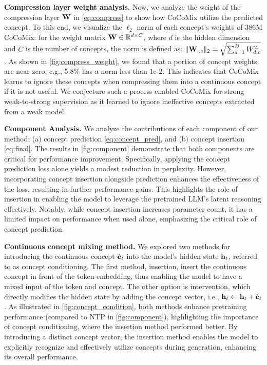 \documentclass[]{fairmeta}
\newcommand{\sname}{CoCoMix\xspace}
\begin{document}
\textbf{Compression layer weight analysis.} Now, we analyze the weight of the compression layer ${\mathbf{W}}$ in \autoref{eq:compress} to show how \sname utilize the predicted concept. To this end, we visualize the $\ell_2$ norm of each concept's weights of 386M \sname: for the weight matrix ${\mathbf{W}} \in \mathbb{R}^{d \times C}$, where $d$ is the hidden dimension and $C$ is the number of concepts, the norm is defined as: $\lVert{\mathbf{W}}_{:,c}\rVert_2 = \sqrt{\sum_{d=1}^D W_{d,c}^2}$. As shown in \autoref{fig:compress_weight}, we found that a portion of concept weights are near zero, e.g., 5.8\% has a norm less than $1\text{e-}2$. This indicates that \sname learns to ignore these concepts when compressing them into a continuous concept if it is not useful. We conjecture such a process enabled \sname for strong weak-to-strong supervision as it learned to ignore ineffective concepts extracted from a weak model.

\textbf{Component Analysis.} We analyze the contributions of each component of our method: (a) concept prediction \autoref{eq:concept_pred}, and (b) concept insertion \autoref{eq:final}. The results in \autoref{fig:component} demonstrate that both components are critical for performance improvement. Specifically, applying the concept prediction loss alone yields a modest reduction in perplexity. However, incorporating concept insertion alongside prediction enhances the effectiveness of the loss, resulting in further performance gains. This highlights the role of insertion in enabling the model to leverage the pretrained LLM's latent reasoning effectively. Notably, while concept insertion increases parameter count, it has a limited impact on performance when used alone, emphasizing the critical role of concept prediction.

\textbf{Continuous concept mixing method.}
We explored two methods for introducing the continuous concept $\hat{{\mathbf{c}}}_t$ into the model’s hidden state ${\mathbf{h}}_t$, referred to as concept conditioning. The first method, {insertion}, insert the continuous concept in front of the token embedding, thus enabling the model to have a mixed input of the token and concept. The other option is {intervention}, which directly modifies the hidden state by adding the concept vector, i.e., ${\mathbf{h}}_t \leftarrow {\mathbf{h}}_t + \hat{{\mathbf{c}}}_t$. As illustrated in \autoref{fig:concept_condition}, both methods enhance pretraining performance (compared to NTP in \autoref{fig:component}), highlighting the importance of concept conditioning, where the insertion method performed better. By introducing a distinct concept vector, the insertion method enables the model to explicitly recognize and effectively utilize concepts during generation, enhancing its overall performance.
\end{document}
